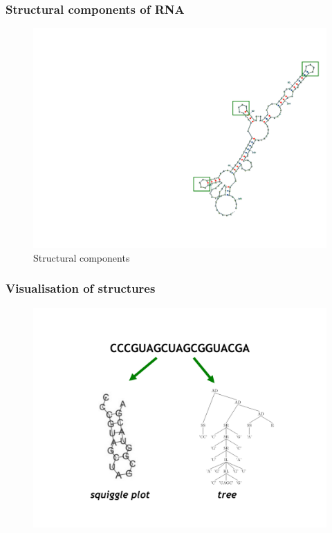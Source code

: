 \documentclass[ignorenonframetext,10pt]{beamer}
\begin{document}
\begin{frame}
\frametitle{Structural components of RNA}  
\begin{figure}
  \includegraphics[scale=0.4]{images/structural_components.pdf} 
  \caption{Structural components}
\end{figure}
\end{frame}


\begin{frame}
\frametitle{Visualisation of structures}  
\begin{figure}
  \includegraphics[scale=0.4]{images/visualisation_structures.pdf} 
\end{figure}
\end{frame}
\end{document}
